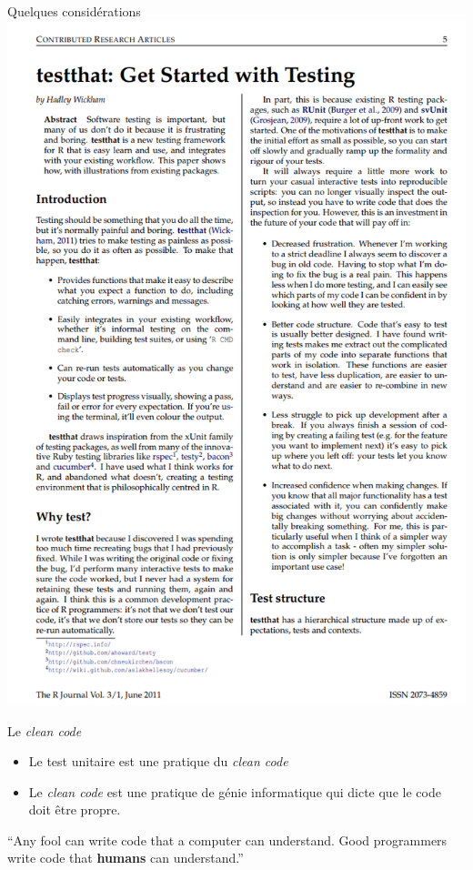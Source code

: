 \documentclass[11pt]{beamer}
\begin{document}
\begin{frame}{Quelques considérations}
\includegraphics[height=0.25\textheight]{testthat} 

\end{frame}

\begin{frame}{Le \textit{clean code}} 
\begin{itemize}
    \item Le test unitaire est une pratique du \textit{clean code}
    \item Le \textit{clean code} est une pratique de génie informatique qui dicte que le code doit être propre. 
\end{itemize}
\begin{block}{}
{\large ``Any fool can write code that a computer can understand. Good programmers
write code that \textbf{humans} can understand.''}
\vskip5mm
\hspace*{}
\end{block}
\end{frame}
\end{document}
